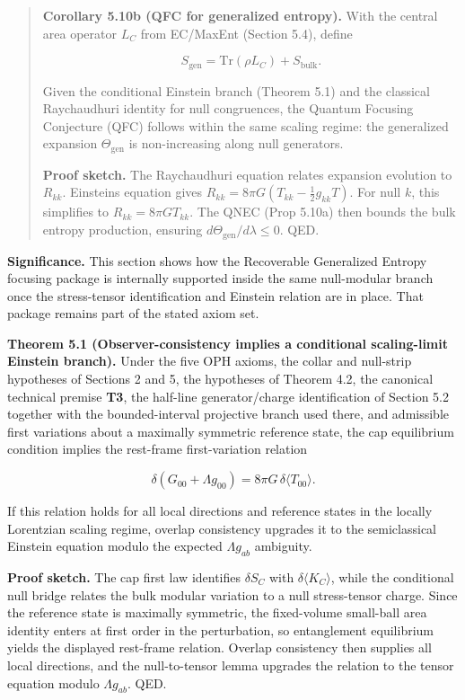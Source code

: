 \begin{quote}
\textbf{Corollary 5.10b (QFC for generalized entropy).} With the central area operator \(L_C\) from EC/MaxEnt (Section 5.4), define

\[
S_{\mathrm{gen}} = \mathrm{Tr}(\rho L_C) + S_{\mathrm{bulk}}.
\]

Given the conditional Einstein branch (Theorem 5.1) and the classical Raychaudhuri identity for null congruences, the Quantum Focusing Conjecture (QFC) follows within the same scaling regime: the generalized expansion \(\Theta_{\mathrm{gen}}\) is non-increasing along null generators.

\textbf{Proof sketch.} The Raychaudhuri equation relates expansion evolution to \(R_{kk}\). Einstein\textquotesingle s equation gives \(R_{kk} = 8\pi G (T_{kk} - \frac{1}{2}g_{kk}T)\). For null \(k\), this simplifies to \(R_{kk} = 8\pi G T_{kk}\). The QNEC (Prop 5.10a) then bounds the bulk entropy production, ensuring \(d\Theta_{\mathrm{gen}}/d\lambda \le 0\). QED.
\end{quote}

\textbf{Significance.} This section shows how the Recoverable Generalized Entropy focusing package is internally supported inside the same null-modular branch once the stress-tensor identification and Einstein relation are in place. That package remains part of the stated axiom set.

\textbf{Theorem 5.1 (Observer-consistency implies a conditional scaling-limit Einstein branch).} Under the five OPH axioms, the collar and null-strip hypotheses of Sections 2 and 5, the hypotheses of Theorem 4.2, the canonical technical premise \textbf{T3}, the half-line generator/charge identification of Section 5.2 together with the bounded-interval projective branch used there, and admissible first variations about a maximally symmetric reference state, the cap equilibrium condition implies the rest-frame first-variation relation

\[
\delta\!\left(G_{00}+\Lambda g_{00}\right)=8\pi G\,\delta\langle T_{00}\rangle.
\]

If this relation holds for all local directions and reference states in the locally Lorentzian scaling regime, overlap consistency upgrades it to the semiclassical Einstein equation modulo the expected \(\Lambda g_{ab}\) ambiguity.

\textbf{Proof sketch.} The cap first law identifies \(\delta S_C\) with \(\delta\langle K_C\rangle\), while the conditional null bridge relates the bulk modular variation to a null stress-tensor charge. Since the reference state is maximally symmetric, the fixed-volume small-ball area identity enters at first order in the perturbation, so entanglement equilibrium yields the displayed rest-frame relation. Overlap consistency then supplies all local directions, and the null-to-tensor lemma upgrades the relation to the tensor equation modulo \(\Lambda g_{ab}\). QED.

